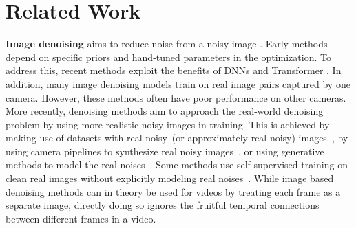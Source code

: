 \documentclass[10pt,twocolumn,letterpaper]{article}
\newlength \g
\begin{document}
\vspace{-3mm}
\section{Related Work}
\label{sec:related_work}

\vspace{-1mm}
\noindent\textbf{Image denoising}
aims to reduce noise from a noisy image \cite{kim2021noise2score,fu2021unfolding,luo2021functional,bodrito2021trainable}.
Early methods~\cite{dabov2007bm3d, lebrun2013nlb} 
depend on specific priors and hand-tuned parameters in the optimization.
To address this, recent methods exploit the benefits of DNNs \cite{zhang2017dncnn,santhanam2017rbdn,zhang2018ffdnet} and Transformer \cite{liu2021swin,liang2021swinir,zhang2022scunet}.
In addition, many image denoising models \cite{plotz2017benchmarking,brooks2019unprocessing} train on real image pairs captured by one camera.
However, these methods often have poor performance on other cameras.
More recently, denoising methods aim to approach the real-world denoising problem by using more realistic noisy images in training. This is achieved by making use of datasets with real-noisy~(or approximately real noisy) images~\cite{anwar2019real, kim2020transfer}, by using camera pipelines to synthesize real noisy images~\cite{jaroensri2019generating, cao2021pseudo, zamir2020cycleisp, conde2022model}, or using generative methods to model the real noises~\cite{chen2018image, kim2019grdn, yue2020dual, chang2020learning, vo2021hi, jang2021c2n, maleky2022noise2noiseflow}. Some methods use self-supervised training on clean real images without explicitly modeling real noises~\cite{wu2020unpaired, zheng2021unsupervised, kim2021noise2score, xie2020noise2same, huang2021neighbor2neighbor, quan2020self2self}.
While image based denoising methods can in theory be used for videos by treating each frame as a separate image, directly doing so ignores the fruitful temporal connections between different frames in a video.
\end{document}
